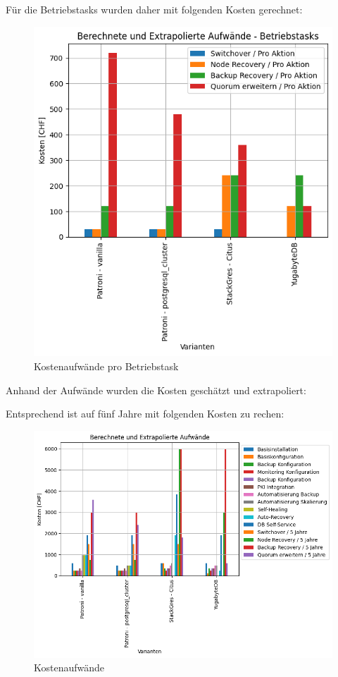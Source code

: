 \begin{flushleft}
    Für die Betriebstasks wurden daher mit folgenden Kosten gerechnet:
    \begin{figure}[H]
        \centering
        \includegraphics[width=0.75\linewidth]{source/pandas_data_chart_plotter/cost_investment_action}
        \caption{Kostenaufwände pro Betriebstask}
        \label{fig:cost_investment_action}
    \end{figure}
\end{flushleft}
\begin{flushleft}
    Anhand der Aufwände wurden die Kosten geschätzt und extrapoliert:
    
    Entsprechend ist auf fünf Jahre mit folgenden Kosten zu rechen:
    \begin{figure}[H]
        \centering
        \includegraphics[width=0.75\linewidth]{source/pandas_data_chart_plotter/cost_investment}
        \caption{Kostenaufwände}
        \label{fig:cost_investment}
    \end{figure}
\end{flushleft}
